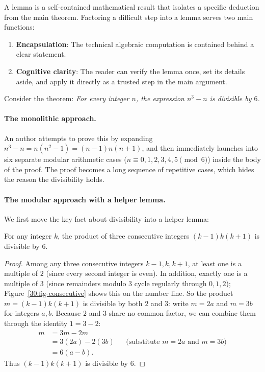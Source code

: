A lemma is a self-contained mathematical result that isolates a specific deduction from the main theorem. Factoring a difficult step into a lemma serves two main functions:
\begin{enumerate}
\item \textbf{Encapsulation}: The technical algebraic computation is contained behind a clear statement.
\item \textbf{Cognitive clarity}: The reader can verify the lemma once, set its details aside, and apply it directly as a trusted step in the main argument.
\end{enumerate}

\begin{example}
Consider the theorem: \emph{For every integer $n$, the expression $n^3 - n$ is divisible by $6$.}

\paragraph{The monolithic approach.}
An author attempts to prove this by expanding $n^3 - n = n(n^2 - 1) = (n-1)n(n+1)$, and then immediately launches into six separate modular arithmetic cases ($n \equiv 0, 1, 2, 3, 4, 5 \pmod 6$) inside the body of the proof. The proof becomes a long sequence of repetitive cases, which hides the reason the divisibility holds.

\paragraph{The modular approach with a helper lemma.}
We first move the key fact about divisibility into a helper lemma:

\begin{lemma}
For any integer $k$, the product of three consecutive integers $(k-1)k(k+1)$ is divisible by $6$.
\end{lemma}
\begin{proof}
Among any three consecutive integers $k-1, k, k+1$, at least one is a multiple of $2$ (since every second integer is even). In addition, exactly one is a multiple of $3$ (since remainders modulo $3$ cycle regularly through $0, 1, 2$); Figure~\ref{30:fig-consecutive} shows this on the number line. So the product $m = (k-1)k(k+1)$ is divisible by both $2$ and $3$: write $m = 2a$ and $m = 3b$ for integers $a, b$. Because $2$ and $3$ share no common factor, we can combine them through the identity $1 = 3 - 2$:
\begin{align*}
m &= 3m - 2m \\
  &= 3(2a) - 2(3b) && \text{(substitute $m = 2a$ and $m = 3b$)} \\
  &= 6(a - b).
\end{align*}
Thus $(k-1)k(k+1)$ is divisible by $6$.
\end{proof}


\end{example}
